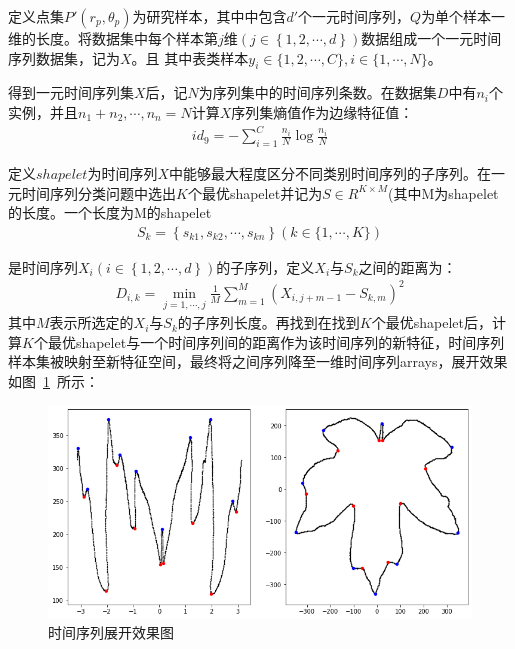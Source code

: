 \documentclass{whutmod}
\begin{document}
		定义点集${{P}'(r_{p},\theta _{p})}$为研究样本，其中中包含${d}'$个一元时间序列，$Q$为单个样本一维的长度。将数据集中每个样本第$j$维$(j\in \left \{1,2,\cdots,d  \right \})$数据组成一个一元时间序列数据集，记为$X$。且
		其中表类样本$y _ { i } \in \{ 1,2 , \cdots , C \} , i \in \{ 1 , \cdots , N \}$。
		
		得到一元时间序列集$X$后，记$N$为序列集中的时间序列条数。在数据集$D$中有$n_{i}$个实例，并且$n_{1}+n_{2},\cdots,n_{n}=N$计算$X$序列集熵值作为边缘特征值：
		\begin{gather}
		id_{9}= - \sum _ { i = 1 } ^ { C } \frac { n _ { i } } { N } \log \frac { n _ { i } } { N }
		\end{gather}
		
		定义$shapelet$为时间序列$X$中能够最大程度区分不同类别时间序列的子序列。在一元时间序列分类问题中选出$K$个最优shapelet并记为$S\in R^{K\times M}$(其中M为shapelet的长度。一个长度为M的shapelet
		\begin{gather}
		S_{k}=\left\{ s _ { k 1 } , s _ { k 2 } , \cdots , s _ { k n } \right\} ( k \in \{ 1 , \cdots , K \} )
		\end{gather}
	
		是时间序列$X_{i}(i\in \left \{1,2,\cdots,d  \right \})$的子序列，定义$X_{i}$与$S_{k}$之间的距离为：
		\begin{gather}
		D _ { i , k } = \min _ { j = 1 , \cdots , j } \frac { 1 } { M } \sum _ { m = 1 } ^ { M } \left( X _ { i , j + m - 1 } - S _ { k , m } \right) ^ { 2 }
		\end{gather}
		其中$M$表示所选定的$X_{i}$与$S_{k}$的子序列长度。再找到在找到$K$个最优shapelet后，计算$K$个最优shapelet与一个时间序列间的距离作为该时间序列的新特征，时间序列样本集被映射至新特征空间，最终将之间序列降至一维时间序列arrays，展开效果如图~\ref{99}~所示：
		
		\begin{figure}[H]
		\centering
		\includegraphics[width=\textwidth]{figures/sjxl.png}
		\caption{时间序列展开效果图}\label{99}
		\end{figure}
	
\end{document}
